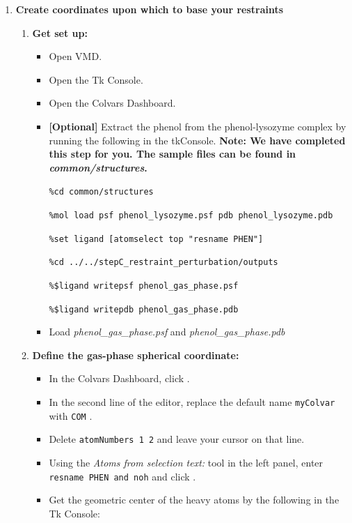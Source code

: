 \documentclass[9pt,tutorial]{Styling/livecoms}
\newcommand{\tkconsole}[1]{\texttt{\%#1}}
\newcommand{\filepath}[1]{\textit{#1}}
\newcommand{\button}[1]{
  \inlineBox[gray]{\texttt{#1}}
}
\newcommand{\menu}[1]{
  \textit{#1}
}
\newcommand{\textInput}[1]{
  \texttt{#1}
}
\begin{document}
    \begin{enumerate}[label=\arabic*.]
    
        \item \textbf{Create coordinates upon which to base your restraints}
        \begin{enumerate}[label=\alph*., ref=\theenumi.\alph*]
            \item \textbf{Get set up:}
            \begin{itemize}
                \item Open VMD.
                \item Open the Tk Console.
                \item Open the Colvars Dashboard.
                
                \item \textbf{[Optional]} Extract the phenol from the phenol-lysozyme complex by running the following in the tkConsole. \textbf{Note: We have completed this step for you. The sample files can be found in \filepath{common/structures}.}
            
                \tkconsole{cd common/structures}
                
                \tkconsole{mol load psf phenol\_lysozyme.psf pdb phenol\_lysozyme.pdb}
                
                \tkconsole{set ligand [atomselect top "resname PHEN"]}
                
                \tkconsole{cd ../../stepC\_restraint\_perturbation/outputs}
                
                \tkconsole{\$ligand writepsf phenol\_gas\_phase.psf}
                
                \tkconsole{\$ligand writepdb phenol\_gas\_phase.pdb}

                \item Load \filepath{phenol\_gas\_phase.psf} and \filepath{phenol\_gas\_phase.pdb}

                \end{itemize}

            \item \textbf{Define the gas-phase spherical coordinate:} \label{step:defineGasRestraints}
            \begin{itemize}
                \item In the Colvars Dashboard, click \button{New [Ctrl-n]}.
                \item In the second line of the editor, replace the default name \textInput{myColvar} with \textInput{COM}.
                \item Delete \textInput{atomNumbers 1 2} and leave your cursor on that line.
                \item Using the \menu{Atoms from selection text:} tool in the left panel, enter \textInput{resname PHEN and noh} and click \button{Insert [Enter]}.
                \item Get the geometric center of the heavy atoms by  the following in the Tk Console:
                

\end{itemize}
\end{enumerate}
\end{enumerate}
\end{document}
